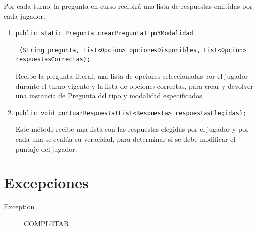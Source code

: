 \documentclass[titlepage,a4paper]{article}
\begin{document}
Por cada turno, la pregunta en curso recibirá una lista de respuestas emitidas por cada jugador. \\

\begin{enumerate}
\item \begin{verbatim}public static Pregunta crearPreguntaTipoYModalidad\end{verbatim} \begin{verbatim} (String pregunta, List<Opcion> opcionesDisponibles, List<Opcion> respuestasCorrectas);\end{verbatim}
 Recibe la pregunta literal, una lista de opciones seleccionadas por el jugador durante el turno vigente y la lista de opciones correctas, para crear y devolver una instancia de Pregunta del tipo y modalidad especificados.
\item \begin{verbatim}
public void puntuarRespuesta(List<Respuesta> respuestasElegidas);\end{verbatim}
Este método recibe una lista con las respuestas elegidas por el jugador y por cada una se evalúa su veracidad, para determinar si se debe modificar el puntaje del jugador.
\end{enumerate}


\section{Excepciones}

\begin{description}
\item[Exception] COMPLETAR
\end{description}
\end{document}
